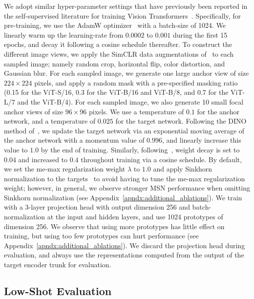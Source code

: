 \documentclass{article}
\begin{document}
We adopt similar hyper-parameter settings that have previously been reported in the self-supervised literature for training Vision Transformers~\citep{caron2021emerging,chen2020exploring}.
Specifically, for pre-training, we use the AdamW optimizer~\citep{loshchilov2017decoupled} with a batch-size of 1024.
We linearly warm up the learning-rate from $0.0002$ to $0.001$ during the first 15 epochs, and decay it following a cosine schedule thereafter.
To construct the different image views, we apply the SimCLR data augmentations of~\citet{chen2020simple} to each sampled image; namely random crop, horizontal flip, color distortion, and Gaussian blur.
For each sampled image, we generate one large anchor view of size $224\times224$ pixels, and apply a random mask with a pre-specified masking ratio (0.15 for the ViT-S/16, 0.3 for the ViT-B/16 and ViT-B/8, and 0.7 for the ViT-L/7 and the ViT-B/4).
For each sampled image, we also generate 10 small focal anchor views of size $96\times96$ pixels.
We use a temperature of $0.1$ for the anchor network, and a temperature of $0.025$ for the target network.
Following the DINO method of~\citet{caron2021emerging}, we update the target network via an exponential moving average of the anchor network with a momentum value of $0.996$, and linearly increase this value to $1.0$ by the end of training.
Similarly, following~\citet{caron2021emerging}, weight decay is set to $0.04$ and increased to $0.4$ throughout training via a cosine schedule.
By default, we set the {\sc me-max} regularization weight $\lambda$ to $1.0$ and apply Sinkhorn normalization to the targets~\citep{caron2020unsupervised} to avoid having to tune the {\sc me-max} regularization weight; however, in general, we observe stronger MSN performance when omitting Sinkhorn normalization (see Appendix~\ref{apndx:additional_ablations}).
We train with a 3-layer projection head with output dimension 256 and batch-normalization at the input and hidden layers, and use 1024 prototypes of dimension 256.
We observe that using more prototypes has little effect on training, but using too few prototypes can hurt performance (see Appendix~\ref{apndx:additional_ablations}).
We discard the projection head during evaluation, and always use the representations computed from the output of the target encoder trunk for evaluation.

\subsection{Low-Shot Evaluation}
\end{document}
